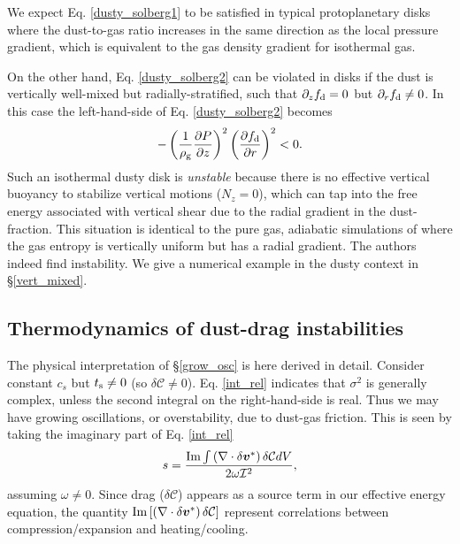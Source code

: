 We expect Eq. \ref{dusty_solberg1} to be satisfied in typical
protoplanetary disks where the dust-to-gas ratio increases in the same
direction as the local pressure gradient, which is equivalent to the
gas density gradient for isothermal gas. 

On the other hand, Eq. \ref{dusty_solberg2} can be violated in
disks if the dust is vertically well-mixed but radially-stratified,  
such that $\partial_zf_\mathrm{d} = 0$ but $\partial_rf_\mathrm{d}\neq0$. In this case the
left-hand-side of Eq. \ref{dusty_solberg2} becomes
\begin{align}
-\left(\frac{1}{\rho_\mathrm{g}}\frac{\partial P}{\partial
    z}\right)^2\left(\frac{\partial f_\mathrm{d}}{\partial r}\right)^2<0.
\end{align}
Such an isothermal dusty disk is \emph{unstable} because there is no
effective vertical buoyancy to stabilize vertical motions ($N_z=0$),
which can tap into the free energy associated with  
vertical shear due to the radial gradient in the dust-fraction. 
This situation is identical to the pure gas, adiabatic simulations of \cite{nelson13}
where the gas entropy is vertically uniform but has a radial
gradient. The authors indeed find instability. We give a numerical
example in the dusty context in \S\ref{vert_mixed}.   

\subsection{Thermodynamics of dust-drag instabilities}\label{dust_work}
The physical interpretation of \S\ref{grow_osc} is here derived in
detail. Consider constant $c_s$ but $t_\mathrm{s}\neq0$ (so $\delta\mathcal{C}
\neq 0$). Eq. \ref{int_rel} indicates that $\sigma^2$ is generally complex, { unless
the second integral on the right-hand-side is real. Thus } 
we may have growing oscillations, or overstability, due to dust-gas
friction. This is seen by taking the imaginary part of
Eq. \ref{int_rel} 
\begin{align}
  s = \frac{\operatorname{Im}\int \left(\nabla\cdot\delta\bm{v}^*\right)\delta\mathcal{C}dV}{2\omega\mathcal{I}^2}, \label{thermal_instability}
\end{align} 
assuming $\omega\neq0$. %
Since drag ($\delta \mathcal{C}$) appears as a source term in our
effective energy equation, the quantity 
$\operatorname{Im}\left[\left(\nabla\cdot\delta\bm{v}^*\right)\delta\mathcal{C}\right]$
represent correlations between compression/expansion and  
heating/cooling.  

